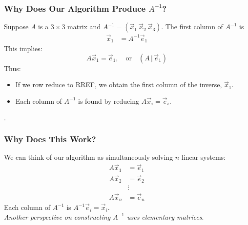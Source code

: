 


\begin{frame}
\frametitle{Why Does Our Algorithm Produce $A^{-1}$?}
Suppose $A$ is a $3\times3$ matrix and $A^{-1} = (\vec x_1 \ \vec x_2 \ \vec x_3)$. The first column of $A^{-1}$ is
\begin{align*}
    \vec x_1 &= A^{-1} \vec e_1 
\end{align*}
This implies: $$A\vec x_1 = \vec e_1, \quad \text{or} \quad (A \, | \, \vec e_1)$$
Thus:
\begin{itemize}
    \item If we row reduce to RREF, we obtain the first column of the inverse, $\vec x_1$. 
    \item Each column of $A^{-1}$ is found by reducing $A \vec x_i = \vec e_i$. 
\end{itemize}

\textit{}.
\end{frame}

\begin{frame}
\frametitle{Why Does This Work?}
We can think of our algorithm as simultaneously solving $n$ linear systems:
\begin{align*}
A \vec x_1 &= \vec e_1\\
A \vec x_2 &= \vec e_2 \\
 & \vdots \\
A \vec x_n &= \vec e_n
\end{align*}
Each column of $A^{-1}$ is $A^{-1} \vec e_i = \vec x_i$. \\[12pt]
\textit{Another perspective on constructing $A^{-1}$ uses elementary matrices}.
\end{frame}


